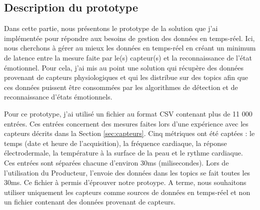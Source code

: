 \documentclass[11pt]{article}
\begin{document}
	\subsection{Description du prototype}\label{sec:protodesc}
		Dans cette partie, nous présentons le prototype de la solution que j'ai implémentée pour répondre aux besoins de gestion des données en temps-réel.
		Ici, nous cherchons à gérer au mieux les données en temps-réel en créant un minimum de latence entre la mesure faite par le(s) capteur(s) et la reconnaissance de l'état émotionnel.
		Pour cela, j'ai mis au point une solution qui récupère des données provenant de capteurs physiologiques et qui les distribue sur des topics afin que ces données puissent être consommées par les algorithmes de détection et de reconnaissance d'états émotionnels.\par
		Pour ce prototype, j'ai utilisé un fichier au format CSV contenant plus de 11 000 entrées. 
		Ces entrées concernent des mesures faites lors d'une expérience avec les capteurs décrits dans la Section \ref{sec:capteurs}.
		Cinq métriques ont été captées : le temps (date et heure de l'acquisition), la fréquence cardiaque, la réponse électrodermale, la température à la surface de la peau et le rythme cardiaque.
		Ces entrées sont séparées chacune d'environ 30ms (milisecondes).
		Lors de l'utilisation du Producteur, l'envoie des données dans les topics se fait toutes les 30ms.
		Ce fichier à permis d'éprouver notre protoype.
		A terme, nous souhaitons utiliser uniquement les capteurs comme sources de données en temps-réel et non un fichier contenant des données provenant de capteurs.
\end{document}
